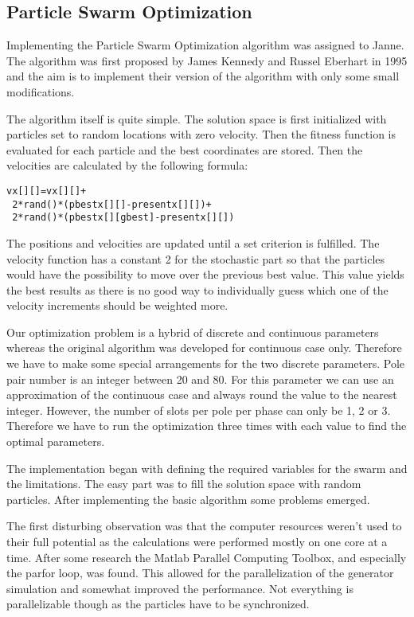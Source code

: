 \documentclass[twoside]{article}
\begin{document}
\begin{multicols}{2}
\section{Particle Swarm Optimization}

Implementing the Particle Swarm Optimization algorithm was assigned to Janne. The algorithm was first proposed by James Kennedy and Russel Eberhart in 1995 and the aim is to implement their version of the algorithm with only some small modifications.

The algorithm itself is quite simple. The solution space is first initialized with particles set to random locations with zero velocity. Then the fitness function is evaluated for each particle and the best coordinates are stored. Then the velocities are calculated by the following formula: \cite{pso}
\begin{verbatim}
vx[][]=vx[][]+
 2*rand()*(pbestx[][]-presentx[][])+
 2*rand()*(pbestx[][gbest]-presentx[][])
\end{verbatim}

The positions and velocities are updated until a set criterion is fulfilled. The velocity function has a constant 2 for the stochastic part so that the particles would have the possibility to move over the previous best value. This value yields the best results as there is no good way to individually guess which one of the velocity increments should be weighted more. \cite{pso} 

Our optimization problem is a hybrid of discrete and continuous parameters whereas the original algorithm was developed for continuous case only. Therefore we have to make some special arrangements for the two discrete parameters. Pole pair number is an integer between 20 and 80. For this parameter we can use an approximation of the continuous case and always round the value to the nearest integer. However, the number of slots per pole per phase can only be 1, 2 or 3. Therefore we have to run the optimization three times with each value to find the optimal parameters.

The implementation began with defining the required variables for the swarm and the limitations. The easy part was to fill the solution space with random particles. After implementing the basic algorithm some problems emerged.

The first disturbing observation was that the computer resources weren't used to their full potential as the calculations were performed mostly on one core at a time. After some research the Matlab Parallel Computing Toolbox, and especially the parfor loop, was found. This allowed for the parallelization of the generator simulation and somewhat improved the performance. Not everything is parallelizable though as the particles have to be synchronized. 


\end{multicols}
\end{document}
